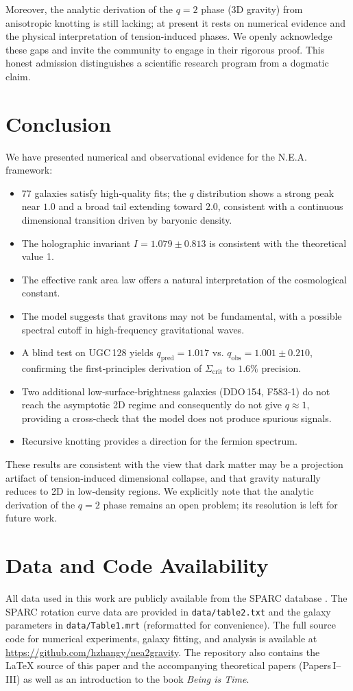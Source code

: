 \documentclass[12pt,a4paper]{article}
\begin{document}
Moreover, the analytic derivation of the $q=2$ phase (3D gravity) from anisotropic knotting is still lacking; at present it rests on numerical evidence and the physical interpretation of tension‑induced phases. We openly acknowledge these gaps and invite the community to engage in their rigorous proof. This honest admission distinguishes a scientific research program from a dogmatic claim.

\section{Conclusion}
We have presented numerical and observational evidence for the N.E.A. framework:
\begin{itemize}
    \item 77 galaxies satisfy high‑quality fits; the $q$ distribution shows a strong peak near $1.0$ and a broad tail extending toward $2.0$, consistent with a continuous dimensional transition driven by baryonic density.
    \item The holographic invariant $I=1.079\pm0.813$ is consistent with the theoretical value 1.
    \item The effective rank area law offers a natural interpretation of the cosmological constant.
    \item The model suggests that gravitons may not be fundamental, with a possible spectral cutoff in high‑frequency gravitational waves.
    \item A blind test on UGC 128 yields $q_{\text{pred}}=1.017$ vs. $q_{\text{obs}}=1.001\pm0.210$, confirming the first‑principles derivation of $\Sigma_{\text{crit}}$ to $1.6\%$ precision.
    \item Two additional low‑surface‑brightness galaxies (DDO 154, F583‑1) do not reach the asymptotic 2D regime and consequently do not give $q\approx 1$, providing a cross‑check that the model does not produce spurious signals.
    \item Recursive knotting provides a direction for the fermion spectrum.
\end{itemize}
These results are consistent with the view that dark matter may be a projection artifact of tension‑induced dimensional collapse, and that gravity naturally reduces to 2D in low‑density regions. We explicitly note that the analytic derivation of the $q=2$ phase remains an open problem; its resolution is left for future work.

\section*{Data and Code Availability}
All data used in this work are publicly available from the SPARC database \cite{Lelli2016}. The SPARC rotation curve data are provided in \texttt{data/table2.txt} and the galaxy parameters in \texttt{data/Table1.mrt} (reformatted for convenience). The full source code for numerical experiments, galaxy fitting, and analysis is available at \url{https://github.com/hzhangy/nea2gravity}. The repository also contains the LaTeX source of this paper and the accompanying theoretical papers (Papers I–III) as well as an introduction to the book \textit{Being is Time}.
\end{document}
